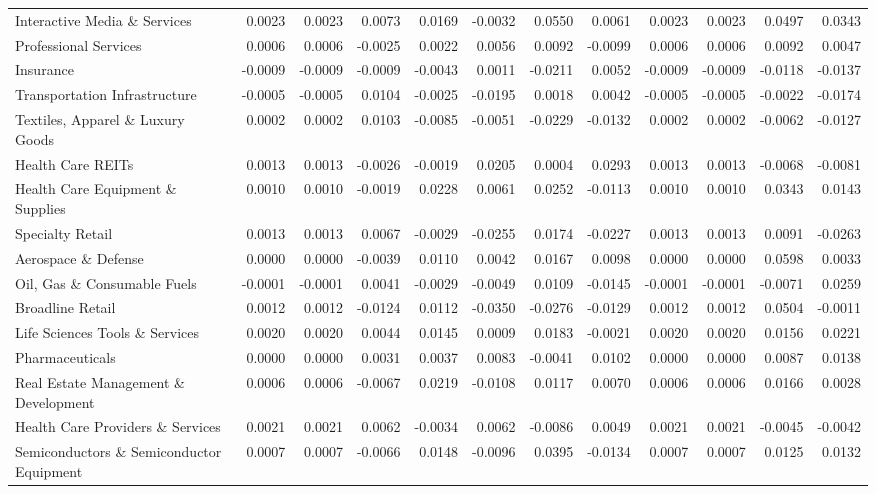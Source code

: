 \begin{table}
\begin{tabular}{lrrrrrrrrrrr}
Interactive Media \& Services & 0.0023 & 0.0023 & 0.0073 & 0.0169 & -0.0032 & 0.0550 & 0.0061 & 0.0023 & 0.0023 & 0.0497 & 0.0343 \\
Professional Services & 0.0006 & 0.0006 & -0.0025 & 0.0022 & 0.0056 & 0.0092 & -0.0099 & 0.0006 & 0.0006 & 0.0092 & 0.0047 \\
Insurance & -0.0009 & -0.0009 & -0.0009 & -0.0043 & 0.0011 & -0.0211 & 0.0052 & -0.0009 & -0.0009 & -0.0118 & -0.0137 \\
Transportation Infrastructure & -0.0005 & -0.0005 & 0.0104 & -0.0025 & -0.0195 & 0.0018 & 0.0042 & -0.0005 & -0.0005 & -0.0022 & -0.0174 \\
Textiles, Apparel \& Luxury Goods & 0.0002 & 0.0002 & 0.0103 & -0.0085 & -0.0051 & -0.0229 & -0.0132 & 0.0002 & 0.0002 & -0.0062 & -0.0127 \\
Health Care REITs & 0.0013 & 0.0013 & -0.0026 & -0.0019 & 0.0205 & 0.0004 & 0.0293 & 0.0013 & 0.0013 & -0.0068 & -0.0081 \\
Health Care Equipment \& Supplies & 0.0010 & 0.0010 & -0.0019 & 0.0228 & 0.0061 & 0.0252 & -0.0113 & 0.0010 & 0.0010 & 0.0343 & 0.0143 \\
Specialty Retail & 0.0013 & 0.0013 & 0.0067 & -0.0029 & -0.0255 & 0.0174 & -0.0227 & 0.0013 & 0.0013 & 0.0091 & -0.0263 \\
Aerospace \& Defense & 0.0000 & 0.0000 & -0.0039 & 0.0110 & 0.0042 & 0.0167 & 0.0098 & 0.0000 & 0.0000 & 0.0598 & 0.0033 \\
Oil, Gas \& Consumable Fuels & -0.0001 & -0.0001 & 0.0041 & -0.0029 & -0.0049 & 0.0109 & -0.0145 & -0.0001 & -0.0001 & -0.0071 & 0.0259 \\
Broadline Retail & 0.0012 & 0.0012 & -0.0124 & 0.0112 & -0.0350 & -0.0276 & -0.0129 & 0.0012 & 0.0012 & 0.0504 & -0.0011 \\
Life Sciences Tools \& Services & 0.0020 & 0.0020 & 0.0044 & 0.0145 & 0.0009 & 0.0183 & -0.0021 & 0.0020 & 0.0020 & 0.0156 & 0.0221 \\
Pharmaceuticals & 0.0000 & 0.0000 & 0.0031 & 0.0037 & 0.0083 & -0.0041 & 0.0102 & 0.0000 & 0.0000 & 0.0087 & 0.0138 \\
Real Estate Management \& Development & 0.0006 & 0.0006 & -0.0067 & 0.0219 & -0.0108 & 0.0117 & 0.0070 & 0.0006 & 0.0006 & 0.0166 & 0.0028 \\
Health Care Providers \& Services & 0.0021 & 0.0021 & 0.0062 & -0.0034 & 0.0062 & -0.0086 & 0.0049 & 0.0021 & 0.0021 & -0.0045 & -0.0042 \\
Semiconductors \& Semiconductor Equipment & 0.0007 & 0.0007 & -0.0066 & 0.0148 & -0.0096 & 0.0395 & -0.0134 & 0.0007 & 0.0007 & 0.0125 & 0.0132 \\

\end{tabular}
\end{table}
